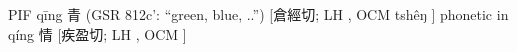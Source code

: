 




PIF  qīng 青 (GSR 812c': ``green, blue, ..'') [倉經切; LH {}, OCM tshêŋ ] phonetic in qíng
情 [疾盈切; LH {}, OCM {}]

